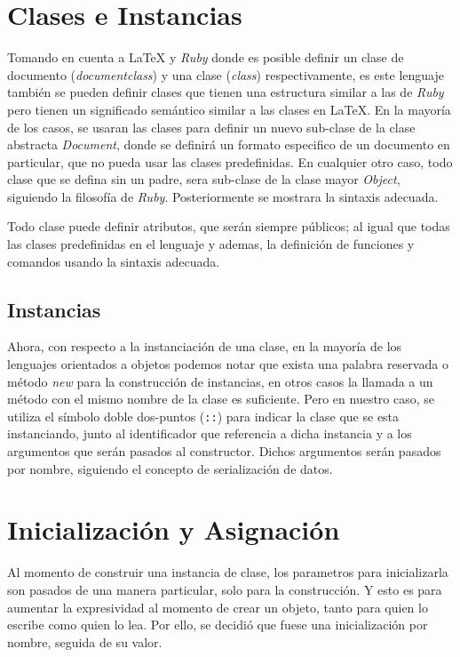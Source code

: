 \documentclass[12pt,letterpaper,titlepage,oneside,openright]{book}
\newcommand{\latex}{\LaTeX\xspace}
\newcommand{\ruby}{\textit{Ruby}\xspace}
\begin{document}
\section{Clases e Instancias}

Tomando en cuenta a \latex y \ruby donde es posible definir un clase de documento
(\textit{documentclass}) y una clase (\textit{class}) respectivamente, es este
lenguaje también se pueden definir clases que tienen una estructura similar a
las de \ruby pero tienen un significado semántico similar a las clases en \latex. En la mayoría de los casos, se usaran las clases para definir un nuevo sub-clase de la clase
abstracta \textit{Document}, donde se definirá un formato especifico de un documento en particular, que no pueda usar las clases predefinidas. En cualquier otro caso, todo clase que se defina sin un padre, sera sub-clase de la clase mayor \textit{Object}, siguiendo la filosofía de \ruby. Posteriormente se mostrara la sintaxis adecuada.

Todo clase puede definir atributos, que serán siempre públicos; al igual que todas las clases predefinidas en el lenguaje y ademas, la definición de funciones y comandos usando la sintaxis adecuada.

\subsection{Instancias}

Ahora, con respecto a la instanciación de una clase, en la mayoría de los
lenguajes orientados a objetos podemos notar que exista una palabra reservada o
método \textit{new} para la construcción de instancias, en otros casos la
llamada a un método con el mismo nombre de la clase es suficiente. Pero en
nuestro caso, se utiliza el símbolo doble dos-puntos (\texttt{::}) para
indicar la clase que se esta instanciando, junto al identificador que referencia
a dicha instancia y a los argumentos que serán pasados al constructor. Dichos
argumentos serán pasados por nombre, siguiendo el concepto de serialización de
datos.

\section{Inicialización y Asignación}

Al momento de construir una instancia de clase, los parametros para inicializarla son pasados de una manera particular, solo para la construcción. Y esto es para aumentar la expresividad al momento de crear un objeto, tanto para quien lo escribe como quien lo lea. Por ello, se decidió que fuese una inicialización por nombre, seguida de su valor.
\end{document}
